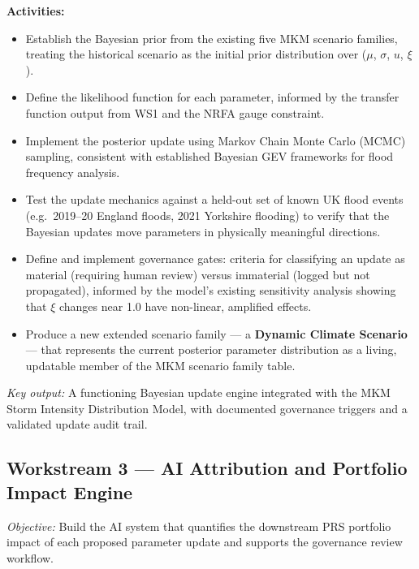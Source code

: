 \documentclass[11pt,a4paper]{article}
\begin{document}
\noindent\textbf{Activities:}
\begin{itemize}
  \item Establish the Bayesian prior from the existing five MKM scenario families,
  treating the historical scenario as the initial prior distribution over
  ($\mu$, $\sigma$, $u$, $\xi$).
  \item Define the likelihood function for each parameter, informed by the transfer
  function output from WS1 and the NRFA gauge constraint.
  \item Implement the posterior update using Markov Chain Monte Carlo (MCMC)
  sampling, consistent with established Bayesian GEV frameworks for flood frequency
  analysis.
  \item Test the update mechanics against a held-out set of known UK flood events
  (e.g.\ 2019--20 England floods, 2021 Yorkshire flooding) to verify that the
  Bayesian updates move parameters in physically meaningful directions.
  \item Define and implement governance gates: criteria for classifying an update
  as material (requiring human review) versus immaterial (logged but not
  propagated), informed by the model's existing sensitivity analysis showing that
  $\xi$ changes near 1.0 have non-linear, amplified effects.
  \item Produce a new extended scenario family --- a \textbf{Dynamic Climate
  Scenario} --- that represents the current posterior parameter distribution as a
  living, updatable member of the MKM scenario family table.
\end{itemize}

\textit{Key output:} A functioning Bayesian update engine integrated with the MKM
Storm Intensity Distribution Model, with documented governance triggers and a
validated update audit trail.

\subsection{Workstream 3 --- AI Attribution and Portfolio Impact Engine}

\textit{Objective:} Build the AI system that quantifies the downstream PRS
portfolio impact of each proposed parameter update and supports the governance
review workflow.
\end{document}
